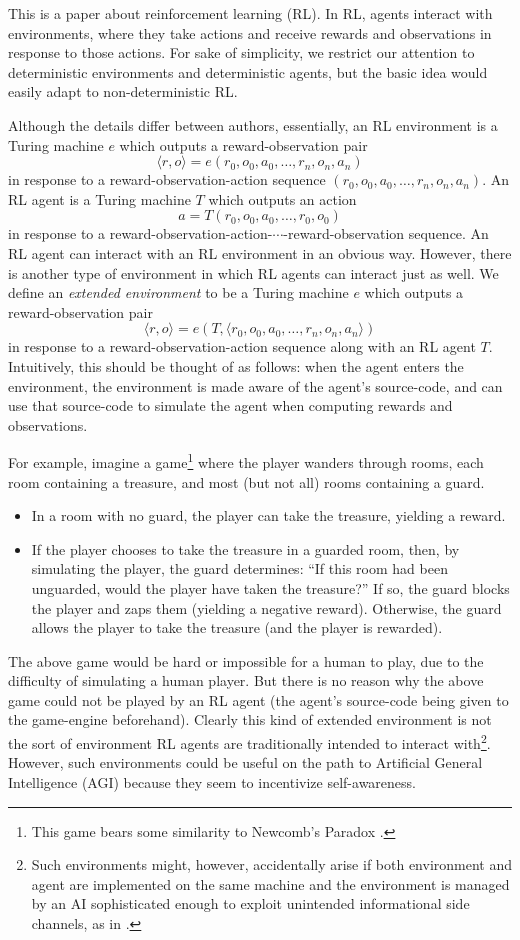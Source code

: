 \documentclass[runningheads]{llncs}
\begin{document}
This is a paper about reinforcement learning (RL).
In RL, agents interact with environments, where they take actions and
receive rewards and observations in response to those actions.
For sake of simplicity, we restrict our attention
to deterministic environments and deterministic agents, but the basic idea
would easily adapt
to non-deterministic RL.

Although the details differ between authors, essentially,
an RL environment is a Turing machine
$e$ which outputs a reward-observation pair
\[
  \langle r,o\rangle=e(r_0,o_0,a_0,\ldots,r_n,o_n,a_n)
\]
in response to a
reward-observation-action sequence $(r_0,o_0,a_0,\ldots,r_n,o_n,a_n)$.
An RL agent is a Turing machine $T$ which outputs an action
\[
  a=T(r_0,o_0,a_0,\ldots,r_0,o_0)
\]
in response to a
reward-observation-action-$\cdots$-reward-observation sequence.
An RL agent can interact with an RL environment in an obvious way.
However, there is another type of environment in which
RL agents can interact just as well. We define an \emph{extended
environment} to be a Turing machine $e$ which outputs a reward-observation pair
\[
    \langle r,o\rangle=e(T,\langle r_0,o_0,a_0,\ldots,r_n,o_n,a_n \rangle)
\]
in response
to a reward-observation-action sequence
along with an RL agent $T$.
Intuitively, this should be thought of as follows: when the agent enters the environment,
the environment is made aware of the agent's source-code, and can use that
source-code to simulate the agent when computing rewards and observations.

For example, imagine a game\footnote{This game bears some similarity to Newcomb's
Paradox \cite{nozick1969newcomb}.} where the player wanders through rooms,
each room containing a treasure, and most (but not all) rooms containing
a guard.
\begin{itemize}
    \item
    In a room with no guard, the player can take the treasure, yielding a reward.
    \item
    If the player chooses to take the treasure in a guarded room,
    then, by simulating the player, the guard determines: ``If
    this room had been unguarded, would the player have taken the treasure?''
    If so, the guard blocks the player and zaps them (yielding a negative reward).
    Otherwise, the guard allows the player to take the treasure (and the player is rewarded).
\end{itemize}

The above game would be hard or impossible
for a human to play, due to the difficulty of simulating a human player.
But there is no reason why the above game could not be played by an RL agent (the
agent's source-code being given to the game-engine beforehand). Clearly this kind of
extended environment is not the sort of environment RL agents are traditionally
intended to interact with\footnote{Such environments might, however,
accidentally arise if both environment
and agent are implemented on the same machine and the environment is managed by an AI
sophisticated enough to exploit unintended informational side channels, as in
\cite{yampolskiy2012leakproofing}.}. However, such environments could be
useful on the path to Artificial
General Intelligence (AGI) because they seem to incentivize self-awareness.
\end{document}
